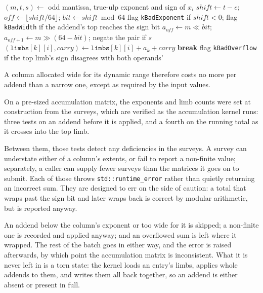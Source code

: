 \documentclass[acmsmall,screen,review]{acmart}
\newcommand{\code}[1]{\texttt{#1}}
\begin{document}
\begin{algorithm}[t]
\caption{Accumulate one column of addends into a column with exponent $e$ and $L$ limbs}
\label{alg:accumulate}
\begin{algorithmic}[1]
  \State $(m, t, s) \gets$ odd mantissa, true-ulp exponent and sign of $x_i$ 
  \State $\mathit{shift} \gets t - e$;\; $\mathit{off} \gets \lfloor \mathit{shift}/64 \rfloor$;\; $\mathit{bit} \gets \mathit{shift} \bmod 64$
  \State flag \code{kBadExponent} if $\mathit{shift} < 0$; flag \code{kBadWidth} if the addend's top reaches the sign bit
  \State $a_{\mathit{off}} \gets m \ll \mathit{bit}$;\; $a_{\mathit{off}+1} \gets m \gg (64 - \mathit{bit})$;\; negate the pair if $s$ 
   
    \State $(\code{limbs}[k][i], \mathit{carry}) \gets \code{limbs}[k][i] + a_k + \mathit{carry}$
     \textbf{break} \EndIf
  \EndFor
  \State flag \code{kBadOverflow} if the top limb's sign disagrees with both operands'
\EndFor
\end{algorithmic}
\end{algorithm}

A column allocated wide for its dynamic range therefore costs no more per addend than a narrow one, except as required by the input values.

On a pre-sized accumulation matrix, the exponents and limb counts were set at construction from the surveys, which are verified as the accumulation kernel runs: three tests on an addend before it is applied, and a fourth on the running total as it crosses into the top limb.

Between them, those tests detect any deficiencies in the surveys. A survey can understate either of a column's extents, or fail to report a non-finite value; separately, a caller can supply fewer surveys than the matrices it goes on to submit. Each of those throws \code{std::runtime\_error} rather than quietly returning an incorrect sum. They are designed to err on the side of caution: a total that wraps past the sign bit and later wraps back is correct by modular arithmetic, but is reported anyway.

An addend below the column's exponent or too wide for it is skipped; a non-finite one is recorded and applied anyway; and an overflowed sum is left where it wrapped. The rest of the batch goes in either way, and the error is raised afterwards, by which point the accumulation matrix is inconsistent. What it is never left in is a torn state: the kernel loads an entry's limbs, applies whole addends to them, and writes them all back together, so an addend is either absent or present in full.
\end{document}
